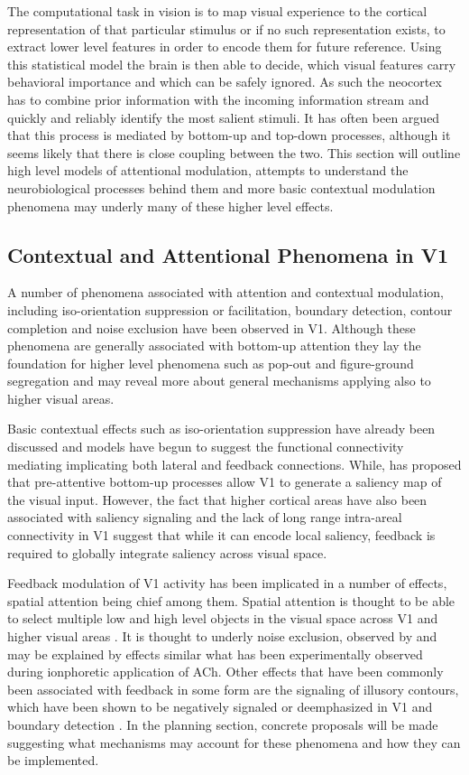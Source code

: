 The computational task in vision is to map visual experience to the
cortical representation of that particular stimulus or if no such
representation exists, to extract lower level features in order to
encode them for future reference. Using this statistical model the
brain is then able to decide, which visual features carry behavioral
importance and which can be safely ignored. As such the neocortex has
to combine prior information with the incoming information stream and
quickly and reliably identify the most salient stimuli. It has often
been argued that this process is mediated by bottom-up and top-down
processes, although it seems likely that there is close coupling
between the two. This section will outline high level models of
attentional modulation, attempts to understand the neurobiological
processes behind them and more basic contextual modulation phenomena
may underly many of these higher level effects.

\subsection{Contextual and Attentional Phenomena in V1}

A number of phenomena associated with attention and contextual
modulation, including iso-orientation suppression or facilitation,
boundary detection, contour completion and noise exclusion have been
observed in V1. Although these phenomena are generally associated with
bottom-up attention they lay the foundation for higher level phenomena
such as pop-out and figure-ground segregation and may reveal more
about general mechanisms applying also to higher visual areas.

Basic contextual effects such as iso-orientation suppression have
already been discussed and models have begun to suggest the functional
connectivity mediating implicating both lateral and feedback
connections. While, \cite{Li2002} has proposed that pre-attentive
bottom-up processes allow V1 to generate a saliency map of the visual
input. However, the fact that higher cortical areas have also been
associated with saliency signaling and the lack of long range
intra-areal connectivity in V1 suggest that while it can encode local
saliency, feedback is required to globally integrate saliency across
visual space.

Feedback modulation of V1 activity has been implicated in a number of
effects, spatial attention being chief among them. Spatial attention
is thought to be able to select multiple low and high level objects in
the visual space across V1 and higher visual areas
\citep{McMains2004}. It is thought to underly noise exclusion,
observed by \cite{Dosher2000} and may be explained by effects similar
what has been experimentally observed during ionphoretic application
of ACh. Other effects that have been commonly been associated with
feedback in some form are the signaling of illusory contours, which
have been shown to be negatively signaled or deemphasized in V1
\citep{Ramsden2001} and boundary detection \citep{Poort2012}.  In the
planning section, concrete proposals will be made suggesting what
mechanisms may account for these phenomena and how they can be
implemented.

